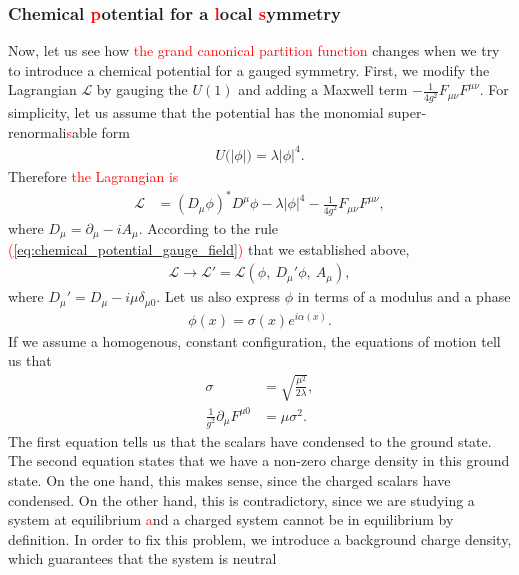         \subsubsection*{Chemical \textcolor{red}{p}otential for a \textcolor{red}{l}ocal \textcolor{red}{s}ymmetry}
        Now, let us see how \textcolor{red}{the grand canonical partition function} changes when we try to introduce a chemical potential for a gauged symmetry. First, we modify the Lagrangian $\mathcal{L}$ by gauging the $U(1)$ and adding a Maxwell term $-\frac{1}{4 g^2} F_{\mu \nu} F^{\mu \nu}$. For simplicity, let us assume that the potential has the monomial super-renormali\textcolor{red}{s}able form
        \begin{align}
            U\big(|\phi| \big) = \lambda |\phi|^4.
        \end{align}
        Therefore \textcolor{red}{the Lagrangian is}
        \begin{align}
            \mathcal{L} &=( D_{\mu} \phi)^* D^{\mu} \phi - \lambda |\phi|^4 - \frac{1}{4 g^2}F_{\mu \nu} F^{\mu \nu},
        \end{align}
        where $D_{\mu}= \partial_{\mu} - i A_{\mu}$. According to the rule \textcolor{red}{(}\ref{eq:chemical_potential_gauge_field}\textcolor{red}{)} that we established above,
        \begin{align}
            \mathcal{L} \rightarrow \mathcal{L}'= \mathcal{L}\left(\phi,\ D_{\mu}' \phi,\ A_{\mu} \right),
        \end{align}
        where $D_{\mu}' = D_{\mu} - i \mu \delta_{\mu 0}$.
        Let us also express $\phi$ in terms of a modulus and a phase
        \begin{align}
            \phi(x) = \sigma(x) e^{i \alpha(x)}.
        \end{align}
        If we assume a homogenous, constant configuration, the equations of motion tell us that
        \begin{align}
            \sigma &= \sqrt{\frac{\mu^2}{2\lambda}}  \label{eq:chem_pot_local_symmetry_eom1}, \\
            \frac{1}{g^2} \partial_{\mu} F^{\mu 0} &= \mu \sigma^2. \label{eq:chem_pot_local_symmetry_eom2}
        \end{align}
        The first equation tells us that the scalars have condensed to the ground state. The second equation states that we have a non-zero charge density in this ground state. On the one hand, this makes sense, since the charged scalars have condensed. On the other hand, this is contradictory, since we are studying a system at equilibrium \textcolor{red}{a}nd a charged system cannot be in equilibrium by definition. In order to fix this problem, we introduce a background charge density, which guarantees that the system is neutral 
